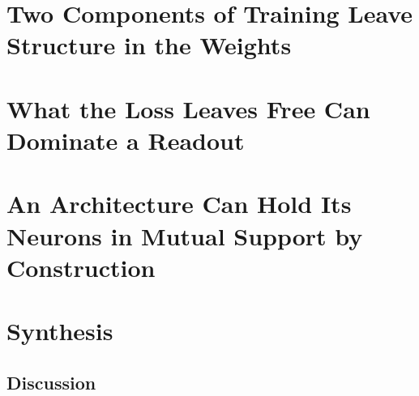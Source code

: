 \documentclass[
	fontsize=10pt, %
	twoside=true, %
	secnumdepth=3, %
	numbers=noenddot, %
]{kaobook}
\begin{document}
\part{Two Components of Training Leave Structure in the Weights}\label{part:procedure}






\part{What the Loss Leaves Free Can Dominate a Readout}\label{part:readout}




\part{An Architecture Can Hold Its Neurons in Mutual Support by Construction}\label{part:construction}




\part{Synthesis}\label{part:synthesis}

\chapter{Discussion}\label{chap:discussion}
\margintoc

\end{document}
